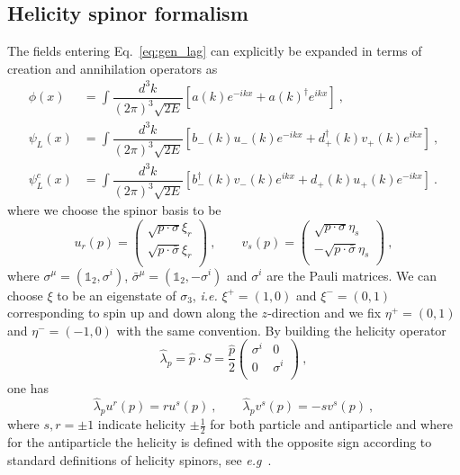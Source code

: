 \documentclass[a4paper,11pt]{article}
\newcommand{\be}{\begin{equation}}
\newcommand{\ee}{\end{equation}}
\newcommand{\nn}{\nonumber}
\begin{document}
\subsection{Helicity spinor formalism}\label{app:hel}

The fields entering Eq.~\eqref{eq:gen_lag} can explicitly be expanded  in terms of creation and annihilation operators as
\begin{align}\label{eq:fields}
\phi(x) & = \int \dfrac{d^3k}{(2 \pi)^3 \sqrt{2E}} \left[a(k) e^{-ikx}+a(k)^\dag e^{ikx}\right] \ ,  \nn  \\
%
 \psi_L(x)&=\int \dfrac{d^3k}{(2 \pi)^3 \sqrt{2E}} \left[b_-(k) u_-(k) e^{-ikx}+d^{\dag}_+(k) v_+(k)e^{ikx}\right]  \ , \nn \\
%
 \psi_L^c(x)&=\int \dfrac{d^3k}{(2 \pi)^3 \sqrt{2E}} \left[b^\dag_-(k) v_-(k)e^{ikx}+d_+(k) u_+(k)e^{-ikx}\right]  \ .
\end{align}
where we choose the spinor basis to be
 \be
u_r(p) = 
\begin{pmatrix}
\sqrt{p \cdot \sigma}\xi_r \\
\sqrt{p \cdot \bar \sigma}\xi_r \\
\end{pmatrix} \ ,
\qquad 
v_s(p) = 
\begin{pmatrix}
\sqrt{p \cdot \sigma}\eta_s \\
- \sqrt{p \cdot \bar \sigma}\eta_s \\
\end{pmatrix} \ ,
\label{eq:spinor_basis}
\ee
where $\sigma^\mu = (\mathbb{1}_2,\sigma^i)$,  $\bar \sigma^\mu = (\mathbb{1}_2,- \sigma^i)$ and $\sigma^i$ are the Pauli matrices. We can choose $\xi$ to be an eigenstate of $\sigma_3$, {\emph{i.e.}} $\xi^+ = (1,0)$ and $\xi^- = (0,1)$ corresponding to spin up and down along the $z$-direction and we fix $\eta^+=(0,1)$ and $\eta^-=(-1,0)$ with the same convention. By building the helicity operator 
\be
\hat \lambda_p = \hat p \cdot S = \frac{\hat p}{2}
\begin{pmatrix}
\sigma^i & 0 \\
0 & \sigma^i \\
\end{pmatrix} \ ,
\ee
one has
\be
\hat \lambda_p u^r(p) = r u^s(p) \ , \qquad \hat \lambda_p v^s(p) = - s v^s(p) \ , 
\ee
where $s,r=\pm 1$ indicate helicity $\pm\frac{1}{2}$ for both particle and antiparticle and where for the antiparticle the helicity is defined with the opposite sign according to standard definitions of helicity spinors, see {\emph{e.g}}~\cite{Chanowitz:1978mv}. 
\end{document}
